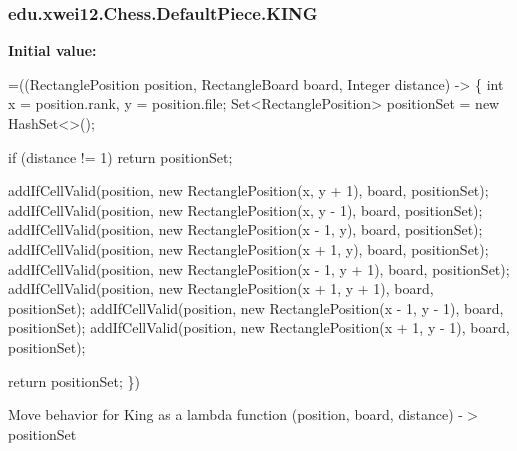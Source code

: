 \subsubsection[{\texorpdfstring{K\+I\+NG}{KING}}]{\setlength{\rightskip}{0pt plus 5cm}edu.\+xwei12.\+Chess.\+Default\+Piece.\+K\+I\+NG}\hypertarget{enumedu_1_1xwei12_1_1_chess_1_1_default_piece_aa20bf961672097f14b86457c896e4832}{}\label{enumedu_1_1xwei12_1_1_chess_1_1_default_piece_aa20bf961672097f14b86457c896e4832}
{\bfseries Initial value\+:}
\begin{DoxyCode}
=((RectanglePosition position, RectangleBoard board, Integer distance) -> \{
        \textcolor{keywordtype}{int} x = position.rank, y = position.file;
        Set<RectanglePosition> positionSet = \textcolor{keyword}{new} HashSet<>();

        
        \textcolor{keywordflow}{if} (distance != 1) \textcolor{keywordflow}{return} positionSet;

        
        addIfCellValid(position, \textcolor{keyword}{new} RectanglePosition(x, y + 1), board, positionSet);
        addIfCellValid(position, \textcolor{keyword}{new} RectanglePosition(x, y - 1), board, positionSet);
        addIfCellValid(position, \textcolor{keyword}{new} RectanglePosition(x - 1, y), board, positionSet);
        addIfCellValid(position, \textcolor{keyword}{new} RectanglePosition(x + 1, y), board, positionSet);
        addIfCellValid(position, \textcolor{keyword}{new} RectanglePosition(x - 1, y + 1), board, positionSet);
        addIfCellValid(position, \textcolor{keyword}{new} RectanglePosition(x + 1, y + 1), board, positionSet);
        addIfCellValid(position, \textcolor{keyword}{new} RectanglePosition(x - 1, y - 1), board, positionSet);
        addIfCellValid(position, \textcolor{keyword}{new} RectanglePosition(x + 1, y - 1), board, positionSet);

        \textcolor{keywordflow}{return} positionSet;
    \})
\end{DoxyCode}
Move behavior for King as a lambda function (position, board, distance) -\/$>$ position\+Set 
